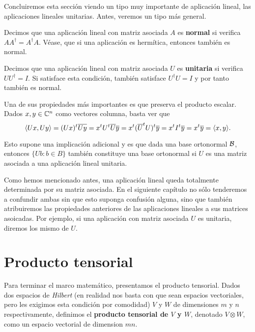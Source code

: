 Concluiremos esta sección viendo un tipo muy importante de aplicación lineal, las aplicaciones lineales unitarias. Antes, veremos un tipo más general.

\begin{definition} Decimos que una aplicación lineal con matriz asociada $A$ es \textbf{normal} si verifica $AA^\dag=A^\dag A$. Véase, que si una aplicación es hermítica, entonces también es normal.
\end{definition}

\begin{definition} Decimos que una aplicación lineal con matriz asociada $U$ es \textbf{unitaria} si verifica $UU^\dag=I$. Si satisface esta condición, también satisface $U^\dag U=I$ y por tanto también es normal.

Una de sus propiedades más importantes es que preserva el producto escalar. Dados $x,y\in\mathbb{C}^n$ como vectores columna, basta ver que
\begin{equation}
\langle Ux,Uy\rangle=(Ux)^t\overline{Uy}=x^t U^t\overline{U}\overline{y}=x^t (\overline{U}^t U)^t\overline{y}=x^t I^t\overline{y}=x^t\overline{y}=\langle x,y\rangle.
\end{equation}

Esto supone una implicación adicional y es que dada una base ortonormal $\mathcal{B}$, entonces $\{Ub: b\in B\}$ también constituye una base ortonormal si $U$ es una matriz asociada a una aplicación lineal unitaria.
\end{definition}

Como hemos mencionado antes, una aplicación lineal queda totalmente determinada por su matriz asociada. En el siguiente capítulo no sólo tenderemos a confundir ambas sin que esto suponga confusión alguna, sino que también atribuiremos las propiedades anteriores de las aplicaciones lineales a sus matrices asoicadas. Por ejemplo, si una aplicación con matriz asociada $U$ es unitaria, diremos los mismo de $U$.

\section{Producto tensorial}

Para terminar el marco matemático, presentamos el producto tensorial. Dados dos espacios de \textit{Hilbert} (en realidad nos basta con que sean espacios vectoriales, pero les exigimos esta condición por comodidad) $V$ y $W$ de dimensiones $m$ y $n$ respectivamente, definimos  el \textbf{producto tensorial de $V$ y $W$}, denotado $V\otimes W$, como un espacio vectorial de dimension $mn$.

